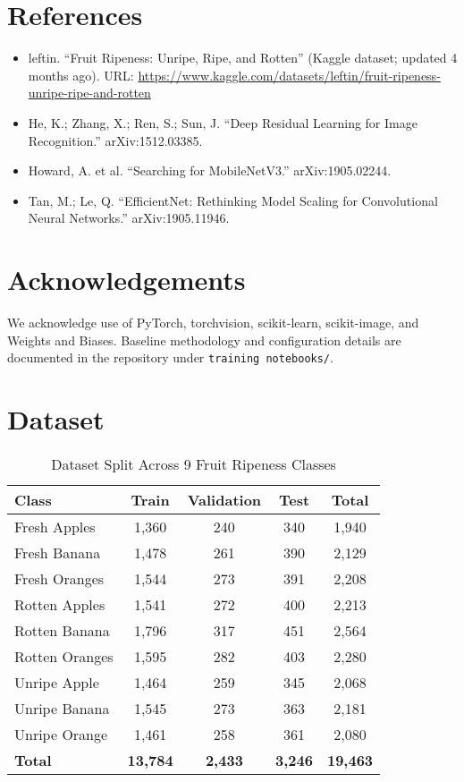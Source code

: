 \documentclass[11pt,a4paper]{article}
\begin{document}
\section*{References}
\begin{itemize}
  \item leftin. ``Fruit Ripeness: Unripe, Ripe, and Rotten'' (Kaggle dataset; updated 4 months ago). URL: \href{https://www.kaggle.com/datasets/leftin/fruit-ripeness-unripe-ripe-and-rotten}{https://www.kaggle.com/datasets/leftin/fruit-ripeness-unripe-ripe-and-rotten}
  \item He, K.; Zhang, X.; Ren, S.; Sun, J. ``Deep Residual Learning for Image Recognition.'' arXiv:1512.03385.
  \item Howard, A. et al. ``Searching for MobileNetV3.'' arXiv:1905.02244.
  \item Tan, M.; Le, Q. ``EfficientNet: Rethinking Model Scaling for Convolutional Neural Networks.'' arXiv:1905.11946.
\end{itemize}

\section*{Acknowledgements}
We acknowledge use of PyTorch, torchvision, scikit-learn, scikit-image, and Weights and Biases. Baseline methodology and configuration details are documented in the repository under \texttt{training notebooks/}.

\appendix
\section{Dataset}
\begin{table}[h]
\centering
\caption{Dataset Split Across 9 Fruit Ripeness Classes}
\label{tab:dataset_split}
\begin{tabular}{lcccc}
\hline
\textbf{Class} & \textbf{Train} & \textbf{Validation} & \textbf{Test} & \textbf{Total} \\
\hline
Fresh Apples & 1,360 & 240 & 340 & 1,940 \\
Fresh Banana & 1,478 & 261 & 390 & 2,129 \\
Fresh Oranges & 1,544 & 273 & 391 & 2,208 \\
Rotten Apples & 1,541 & 272 & 400 & 2,213 \\
Rotten Banana & 1,796 & 317 & 451 & 2,564 \\
Rotten Oranges & 1,595 & 282 & 403 & 2,280 \\
Unripe Apple & 1,464 & 259 & 345 & 2,068 \\
Unripe Banana & 1,545 & 273 & 363 & 2,181 \\
Unripe Orange & 1,461 & 258 & 361 & 2,080 \\
\hline
\textbf{Total} & \textbf{13,784} & \textbf{2,433} & \textbf{3,246} & \textbf{19,463} \\
\hline
\end{tabular}
\end{table}
\end{document}
